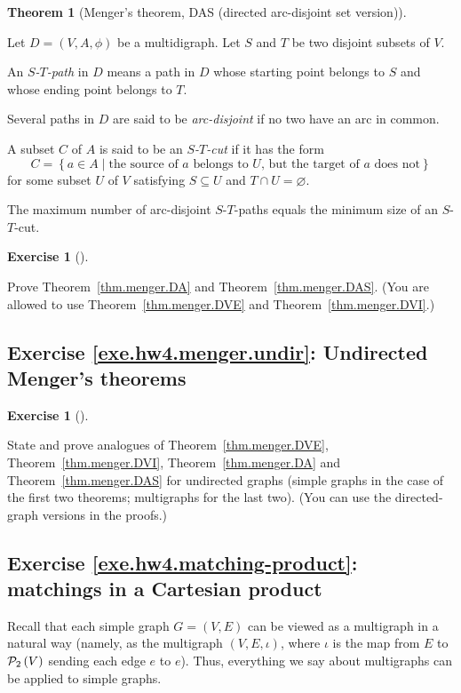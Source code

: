 \documentclass[numbers=enddot,12pt,final,onecolumn,notitlepage]{scrartcl}%
\newcounter{exer}
\theoremstyle{definition}
\newtheorem{theo}{Theorem}[section]
\newenvironment{theorem}[1][]
{\begin{theo}[#1]\begin{leftbar}}
{\end{leftbar}\end{theo}}
\newtheorem{exmp}[exer]{Exercise}
\newenvironment{exercise}[1][]
{\begin{exmp}[#1]\begin{leftbar}}
{\end{leftbar}\end{exmp}}
\newcommand{\powset}[2][]{\ifthenelse{\equal{#2}{}}{\mathcal{P}\left(#1\right)}{\mathcal{P}_{#1}\left(#2\right)}}
\newcommand{\set}[1]{\left\{ #1 \right\}}
\newcommand{\tup}[1]{\left( #1 \right)}
\begin{document}
\begin{theorem}[Menger's theorem, DAS (directed arc-disjoint set
version)] \label{thm.menger.DAS}
Let $D = \tup{V, A, \phi}$ be a multidigraph.
Let $S$ and $T$ be two disjoint subsets of $V$.

An \textit{$S$-$T$-path} in $D$ means a path in $D$ whose starting
point belongs to $S$ and whose ending point belongs to $T$.

Several paths in $D$ are said to be
\textit{arc-disjoint} if no two have an arc in common.

A subset $C$ of $A$ is said to be an \textit{$S$-$T$-cut} if it has
the form
\[
C = \set{ a \in A \mid \text{the source of } a \text{ belongs to } U
                        \text{, but the target of } a \text{ does not}
        }
\]
for some subset $U$ of $V$ satisfying $S \subseteq U$ and
$T \cap U = \varnothing$.

The maximum number of arc-disjoint $S$-$T$-paths equals
the minimum size of an $S$-$T$-cut.
\end{theorem}

\begin{exercise} \label{exe.hw4.menger.DA}
Prove Theorem~\ref{thm.menger.DA} and
Theorem~\ref{thm.menger.DAS}.
(You are allowed to use Theorem~\ref{thm.menger.DVE} and
Theorem~\ref{thm.menger.DVI}.)
\end{exercise}

\subsection{Exercise \ref{exe.hw4.menger.undir}: Undirected Menger's
theorems}

\begin{exercise} \label{exe.hw4.menger.undir}
State and prove analogues of Theorem~\ref{thm.menger.DVE},
Theorem~\ref{thm.menger.DVI}, Theorem~\ref{thm.menger.DA} and
Theorem~\ref{thm.menger.DAS} for undirected graphs (simple graphs in
the case of the first two theorems; multigraphs for the last two).
(You can use the directed-graph versions in the proofs.)
\end{exercise}

\subsection{Exercise \ref{exe.hw4.matching-product}: matchings in a
Cartesian product}

Recall that each simple graph $G = \tup{V, E}$ can be viewed as a
multigraph in a natural way (namely, as the multigraph
$\tup{V, E, \iota}$, where $\iota$ is the map from $E$ to
$\powset[2]{V}$ sending each edge $e$ to $e$).
Thus, everything we say about multigraphs can be applied to simple
graphs.
\end{document}
